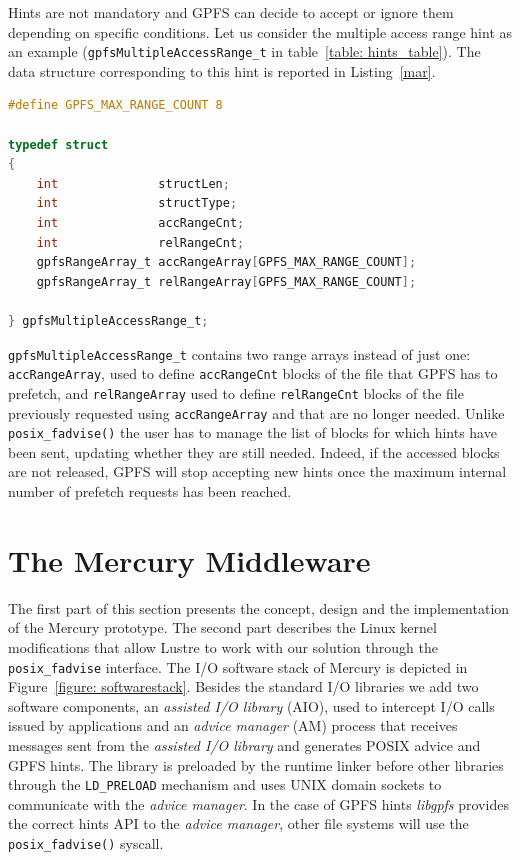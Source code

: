 Hints are not mandatory and GPFS can decide to accept or ignore them depending on specific conditions. Let us consider the multiple access range hint as an example 
(\texttt{gpfsMultipleAccessRange\_t} in table~\ref{table: hints_table}). The data structure corresponding to this hint is reported in Listing~\ref{mar}. 

\begin{lstlisting}[language=C, caption=Multiple Access Range Hint Data Structure, label={mar}]
#define GPFS_MAX_RANGE_COUNT 8

typedef struct
{
    int              structLen;
    int              structType;
    int              accRangeCnt;
    int              relRangeCnt;
    gpfsRangeArray_t accRangeArray[GPFS_MAX_RANGE_COUNT];
    gpfsRangeArray_t relRangeArray[GPFS_MAX_RANGE_COUNT];

} gpfsMultipleAccessRange_t;
\end{lstlisting}

\texttt{gpfsMultipleAccessRange\_t} contains two range arrays instead of just one: \texttt{accRangeArray}, used to define \texttt{accRangeCnt} blocks of the file that 
GPFS has to prefetch, and \texttt{relRangeArray} used to define \texttt{relRangeCnt} blocks of the file previously requested using \texttt{accRangeArray} and that are no 
longer needed. Unlike \texttt{posix\_fadvise()} the user has to manage the list of blocks for which hints have been sent, updating whether they are still needed. Indeed, 
if the accessed blocks are not released, GPFS will stop accepting new hints once the maximum internal number of prefetch requests has been reached. 

\section{The Mercury Middleware} \label{section: mercury_concept}
The first part of this section presents the concept, design and the implementation of the Mercury prototype. The second part describes the Linux kernel modifications that allow Lustre to work with our solution through the \texttt{posix\_fadvise} interface.
The I/O software stack of Mercury is depicted in Figure~\ref{figure: softwarestack}. Besides the standard I/O libraries we add two software components, an \textit{assisted I/O library} (AIO), used to intercept I/O calls issued by applications and 
an \textit{advice manager} (AM) process that receives messages sent from the \textit{assisted I/O library} and generates POSIX advice and GPFS hints. The library is preloaded by the runtime linker before other libraries through the \texttt{LD\_PRELOAD} 
mechanism and uses UNIX domain sockets to communicate with the \textit{advice manager}. In the case of GPFS hints \textit{libgpfs} provides the correct hints API to the \textit{advice manager}, other file systems will use the \texttt{posix\_fadvise()} syscall.

